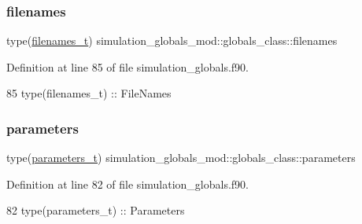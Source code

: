 \subsubsection{\texorpdfstring{filenames}{filenames}}
{\footnotesize\ttfamily type(\mbox{\hyperlink{structsimulation__globals__mod_1_1filenames__t}{filenames\+\_\+t}}) simulation\+\_\+globals\+\_\+mod\+::globals\+\_\+class\+::filenames\hspace{0.3cm}{\ttfamily [private]}}



Definition at line 85 of file simulation\+\_\+globals.\+f90.


\begin{DoxyCode}
85         \textcolor{keywordtype}{type}(filenames\_t)   :: FileNames
\end{DoxyCode}
\mbox{\label{structsimulation__globals__mod_1_1globals__class_aef60024afa0a128d0af3d8a47a732657}} 
\subsubsection{\texorpdfstring{parameters}{parameters}}
{\footnotesize\ttfamily type(\mbox{\hyperlink{structsimulation__globals__mod_1_1parameters__t}{parameters\+\_\+t}}) simulation\+\_\+globals\+\_\+mod\+::globals\+\_\+class\+::parameters\hspace{0.3cm}{\ttfamily [private]}}



Definition at line 82 of file simulation\+\_\+globals.\+f90.


\begin{DoxyCode}
82         \textcolor{keywordtype}{type}(parameters\_t)  :: Parameters
\end{DoxyCode}
\mbox{\label{structsimulation__globals__mod_1_1globals__class_aa066434c9dc6147331dce613422568ae}} 
